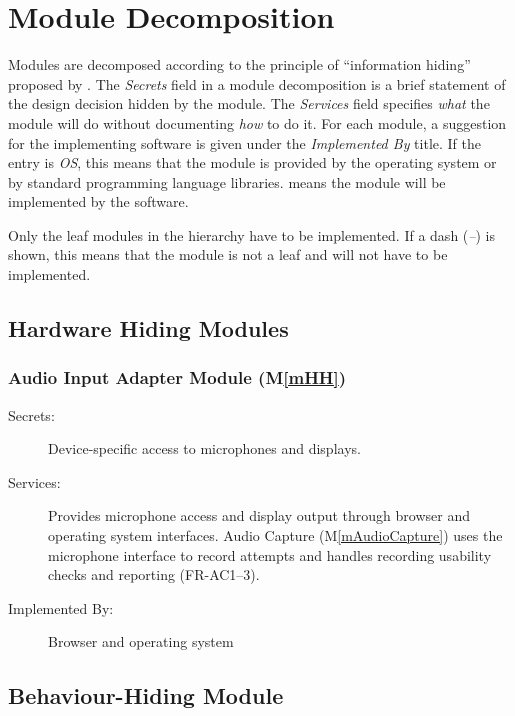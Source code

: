 \documentclass[12pt, titlepage]{article}
\newcommand{\mref}[1]{M\ref{#1}}
\begin{document}

\section{Module Decomposition} \label{SecMD}

Modules are decomposed according to the principle of ``information hiding''
proposed by \citet{ParnasEtAl1984}. The \emph{Secrets} field in a module
decomposition is a brief statement of the design decision hidden by the
module. The \emph{Services} field specifies \emph{what} the module will do
without documenting \emph{how} to do it. For each module, a suggestion for the
implementing software is given under the \emph{Implemented By} title. If the
entry is \emph{OS}, this means that the module is provided by the operating
system or by standard programming language libraries.  \emph{\progname{}} means the
module will be implemented by the \progname{} software.

Only the leaf modules in the hierarchy have to be implemented. If a dash
(\emph{--}) is shown, this means that the module is not a leaf and will not have
to be implemented.

\subsection{Hardware Hiding Modules}

\subsubsection{Audio Input Adapter Module (\mref{mHH})}

\begin{description}
\item[Secrets:] Device-specific access to microphones and displays.
\item[Services:] Provides microphone access and display output through
browser and operating system interfaces. Audio Capture (\mref{mAudioCapture})
uses the microphone interface to record attempts and handles recording
usability checks and reporting (FR-AC1--3).
\item[Implemented By:] Browser and operating system
\end{description}

\subsection{Behaviour-Hiding Module}
\end{document}
